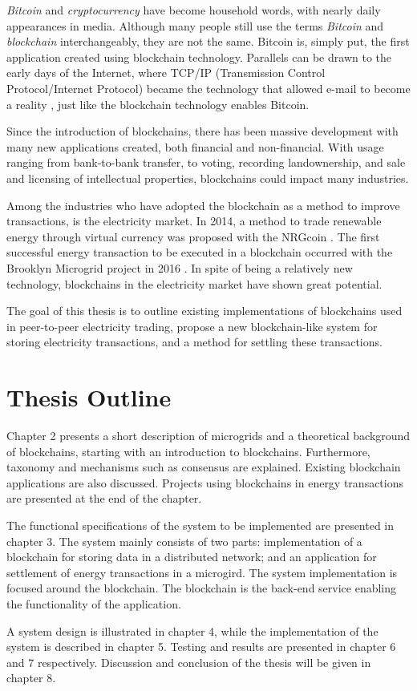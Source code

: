 \textit{Bitcoin} and \textit{cryptocurrency} have become household words, with nearly daily appearances in media. Although many people still use the terms \textit{Bitcoin} and \textit{blockchain} interchangeably, they are not the same. Bitcoin is, simply put, the first application created using blockchain technology. Parallels can be drawn to the early days of the Internet, where TCP/IP (Transmission Control Protocol/Internet Protocol) became the technology that allowed e-mail to become a reality \cite{hbr_truth}, just like the blockchain technology enables Bitcoin. 

Since the introduction of blockchains, there has been massive development with many new applications created, both financial and non-financial. With usage ranging from bank-to-bank transfer, to voting, recording landownership, and sale and licensing of intellectual properties, blockchains could impact many industries. 
 
Among the industries who have adopted the blockchain as a method to improve transactions, is the electricity market. In 2014, a method to trade renewable energy through virtual currency was proposed with the NRGcoin \cite{NRGcoin_Mihaylov}. The first successful energy transaction to be executed in a blockchain occurred with the Brooklyn Microgrid project in 2016 \cite{bm101}. In spite of being a relatively new technology, blockchains in the electricity market have shown great potential. 

The goal of this thesis is to outline existing implementations of blockchains used in peer-to-peer electricity trading, propose a new blockchain-like system for storing electricity transactions, and a method for settling these transactions. 



\section{Thesis Outline}
Chapter 2 presents a short description of microgrids and a theoretical background of blockchains, starting with an introduction to blockchains. Furthermore, taxonomy and mechanisms such as consensus are explained. Existing blockchain applications are also discussed. Projects using blockchains in energy transactions are presented at the end of the chapter. 

The functional specifications of the system to be implemented are presented in chapter 3. The system mainly consists of two parts: implementation of a blockchain for storing data in a distributed network; and an application for settlement of energy transactions in a microgird. The system implementation is focused around the blockchain. The blockchain is the back-end service enabling the functionality of the application.

A system design is illustrated in chapter 4, while the implementation of the system is described in chapter 5. Testing and results are presented in chapter 6 and 7 respectively. Discussion and conclusion of the thesis will be given in chapter 8.






